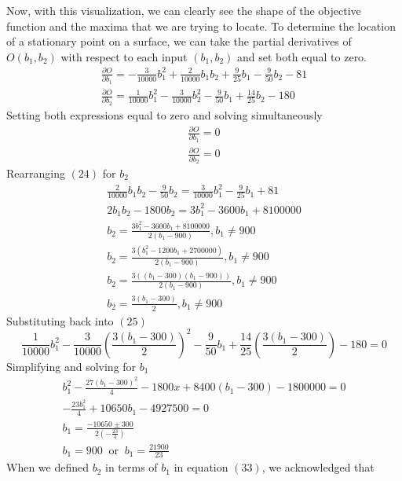 \documentclass{article}
\begin{document}
Now, with this visualization, we can clearly see the shape of the objective function and the maxima that we are
trying to locate. To determine the location of a stationary point on a surface, we can take the partial derivatives
of $O(b_1, b_2)$ with respect to each input $(b_1, b_2)$ and set both equal to zero.
\begin{gather}
    \frac{\partial O}{\partial b_1} = - \frac{3}{10000}b_1^2 + \frac{2}{10000}b_1b_2 + \frac{9}{25}b_1 - \frac{9}{50}b_2 - 81 \\
    \frac{\partial O}{\partial b_2} = \frac{1}{10000}b_1^2 - \frac{3}{10000}b_2^2 - \frac{9}{50}b_1 + \frac{14}{25}b_2 - 180
\end{gather}
Setting both expressions equal to zero and solving simultaneously
\begin{gather}
    \frac{\partial O}{\partial b_1} = 0 \\
    \frac{\partial O}{\partial b_2} = 0
\end{gather}
Rearranging $(24)$ for $b_2$
\begin{gather}
    \frac{2}{10000}b_1b_2 - \frac{9}{50}b_2 = \frac{3}{10000}b_1^2 - \frac{9}{25}b_1 + 81 \\
    2b_1b_2 - 1800b_2 = 3b_1^2 - 3600b_1 + 8100000 \\
    b_2 = \frac{3b_1^2 - 3600b_1 + 8100000}{2(b_1 - 900)}, b_1 \neq 900 \\
    b_2 = \frac{3(b_1^2 - 1200b_1 + 2700000)}{2(b_1 - 900)}, b_1 \neq 900 \\
    b_2 = \frac{3((b_1 - 300)(b_1 - 900))}{2(b_1 - 900)}, b_1 \neq 900 \\
    b_2 = \frac{3(b_1 - 300)}{2}, b_1 \neq 900
\end{gather}
Substituting back into $(25)$
\begin{dmath}
    \frac{1}{10000}b_1^2 - \frac{3}{10000}\left(\frac{3(b_1 - 300)}{2}\right)^2 - \frac{9}{50}b_1 + \frac{14}{25}\left(\frac{3(b_1 - 300)}{2}\right) - 180 = 0
\end{dmath}
Simplifying and solving for $b_1$
\begin{gather}
    b_1^2 - \frac{27(b_1-300)^2}{4} - 1800x + 8400(b_1-300) - 1800000 = 0 \\
    -\frac{23b_1^2}{4} + 10650b_1 - 4927500 = 0 \\
    b_1 = \frac{-10650\pm 300}{2(-\frac{23}{4})} \\
    b_1 = 900 \: \text{ or } \: b_1 = \frac{21900}{23}
\end{gather}
When we defined $b_2$ in terms of $b_1$ in equation $(33)$, we acknowledged that
\end{document}
